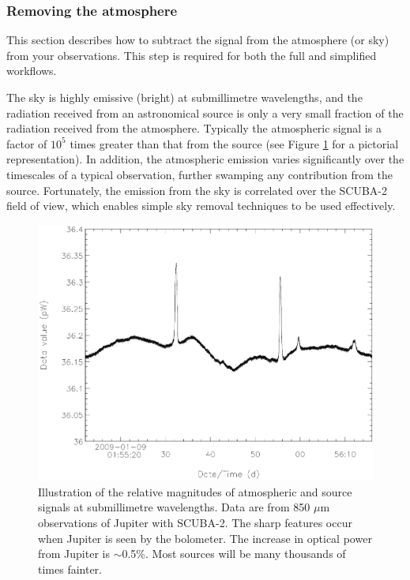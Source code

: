 \documentclass[oneside,11pt]{starlink}
\begin{document}
\subsubsection{Removing the atmosphere\label{se:skysub}}

This section describes how to subtract the signal from the atmosphere
(or sky) from your observations. This step is required for both the
full and simplified workflows.

The sky is highly emissive (bright) at submillimetre
wavelengths\cite{archibald}, and the radiation received from an
astronomical source is only a very small fraction of the radiation
received from the atmosphere. Typically the atmospheric signal is a
factor of $10^5$ times greater than that from the source (see Figure
\ref{fig:signal} for a pictorial representation). In addition, the
atmospheric emission varies significantly over the timescales of a
typical observation, further swamping any contribution from the
source. Fortunately, the emission from the sky is correlated over the
SCUBA-2 field of view, which enables simple sky removal techniques to
be used effectively\cite{archibald,sc2ana002}.

\begin{figure}[htb]
  \begin{center}
    \includegraphics[width=150mm]{sun258_submmsignal}
    \caption{Illustration of the relative magnitudes of atmospheric
      and source signals at submillimetre wavelengths. Data are from
      850 $\mu$m observations of Jupiter with SCUBA-2. The sharp
      features occur when Jupiter is seen by the bolometer. The
      increase in optical power from Jupiter is $\sim$0.5\%. Most
      sources will be many thousands of times fainter.}
    \label{fig:signal}
  \end{center}
\end{figure}
\end{document}
